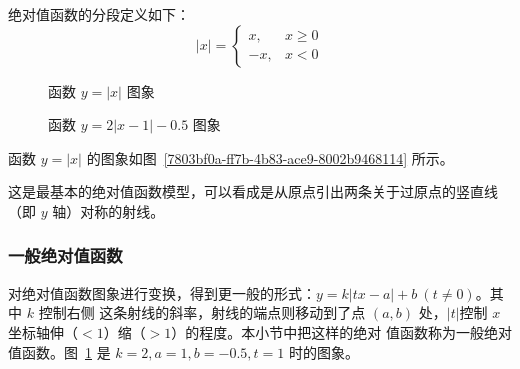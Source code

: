 \documentclass[a4paper,openany]{ctexbook}
\begin{document}
绝对值函数的分段定义如下：
\[
    |x|=\begin{cases}
        x,  & x \ge 0 \\
        -x, & x <0
    \end{cases}
\]

\begin{figure}
    \begin{minipage}{5cm}
        \centering
        \caption{函数 \(y=|x|\) 图象}\label{7803bf0a-ff7b-4b83-ace9-8002b9468114}
    \end{minipage}
    \hfill
    \begin{minipage}{6cm}
        \centering
        \caption{函数 \(y=2|x-1|-0.5\) 图象}\label{59b8dea0-9e48-4165-b6f8-e53600401b19}
    \end{minipage}
\end{figure}

函数 \(y=|x|\) 的图象如图~\ref{7803bf0a-ff7b-4b83-ace9-8002b9468114} 所示。

这是最基本的绝对值函数模型，可以看成是从原点引出两条关于过原点的竖直线（即 \(y\) 轴）对称的射线。

\subsubsection{一般绝对值函数}

对绝对值函数图象进行变换，得到更一般的形式：\(y=k|tx-a|+b\ (t \ne 0)\)。其中 \(k\) 控制右侧
这条射线的斜率，射线的端点则移动到了点 \((a,b)\) 处，\(|t|\)控制 \(x\) 坐标轴伸（\(<1\)）缩（\(>1\)）的程度。本小节中把这样的绝对
值函数称为一般绝对值函数。图~\ref{59b8dea0-9e48-4165-b6f8-e53600401b19} 是 \(k=2,a=1,b=-0.5,t=1\) 时的图象。
\end{document}
